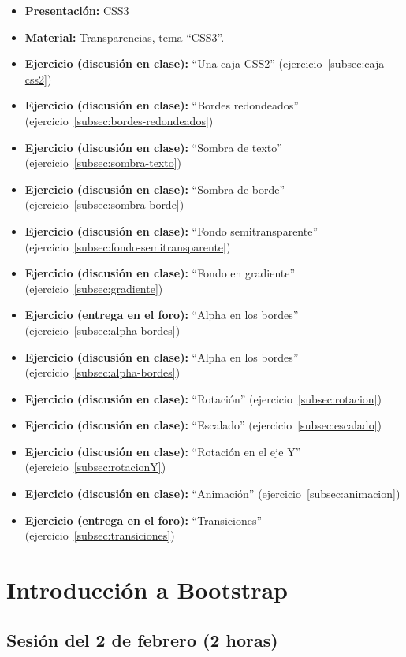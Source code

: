 \documentclass[a4paper,12pt]{report}
\begin{document}
\begin{itemize}
\item \textbf{Presentación:} CSS3
\item \textbf{Material:} Transparencias, tema ``CSS3''.
\item \textbf{Ejercicio (discusión en clase):} ``Una caja CSS2'' (ejercicio~\ref{subsec:caja-css2})
\item \textbf{Ejercicio (discusión en clase):} ``Bordes redondeados'' (ejercicio~\ref{subsec:bordes-redondeados})
\item \textbf{Ejercicio (discusión en clase):} ``Sombra de texto'' (ejercicio~\ref{subsec:sombra-texto})
\item \textbf{Ejercicio (discusión en clase):} ``Sombra de borde'' (ejercicio~\ref{subsec:sombra-borde})
\item \textbf{Ejercicio (discusión en clase):} ``Fondo semitransparente'' (ejercicio~\ref{subsec:fondo-semitransparente})
\item \textbf{Ejercicio (discusión en clase):} ``Fondo en gradiente'' (ejercicio~\ref{subsec:gradiente})
\item \textbf{Ejercicio (entrega en el foro):} ``Alpha en los bordes'' (ejercicio~\ref{subsec:alpha-bordes})
\item \textbf{Ejercicio (discusión en clase):} ``Alpha en los bordes'' (ejercicio~\ref{subsec:alpha-bordes})
\item \textbf{Ejercicio (discusión en clase):} ``Rotación'' (ejercicio~\ref{subsec:rotacion})
\item \textbf{Ejercicio (discusión en clase):} ``Escalado'' (ejercicio~\ref{subsec:escalado})
\item \textbf{Ejercicio (discusión en clase):} ``Rotación en el eje Y'' (ejercicio~\ref{subsec:rotacionY})
\item \textbf{Ejercicio (discusión en clase):} ``Animación'' (ejercicio~\ref{subsec:animacion})
\item \textbf{Ejercicio (entrega en el foro):} ``Transiciones'' (ejercicio~\ref{subsec:transiciones})
\end{itemize}

\section{Introducción a Bootstrap}

\subsection{Sesión del 2 de febrero (2 horas)}
\end{document}
